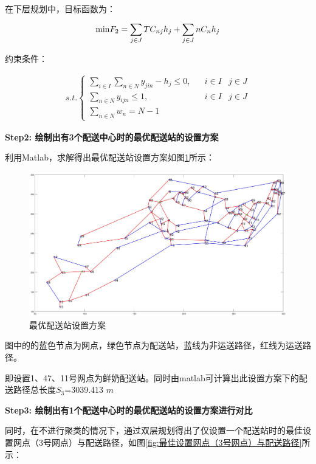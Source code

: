 \documentclass[withoutpreface,bwprint]{cumcmthesis} %
\begin{document}
	在下层规划中，目标函数为：
	\begin{align*}
		{\rm{min }}{F_2} = \sum\limits_{j \in J}^{} {T{C_{nj}}} {h_j} + \sum\limits_{j \in J}^{} {n{C_n}} {h_j}
	\end{align*}
	
	约束条件：
	
	\begin{align*}
		s.t.\left \{{\begin{matrix}\sum_{i\in I}^{}{\sum_{n\in N}^{}{{{y}_{jin}}}}-{{h}_{j}}\le 0,&&i\in I&j\in J\\\sum_{n\in N}^{}{{{y}_{ijn}}}\le 1,&&i\in I&j\in J\\\sum_{n\in N}^{}{{{w}_{n}}}=N-1&&&\end{matrix}}\right.
	\end{align*}
	
	
	\textbf{Step2: 绘制出有3个配送中心时的最优配送站的设置方案}
	
	利用Matlab，求解得出最优配送站设置方案如图\ref{fig:最优配送站设置方案}所示：
	\begin{figure}[htbp]
		\centering
		\includegraphics[width=16cm]{cluster3_real_red_G1.eps}
		\caption{最优配送站设置方案}
		\label{fig:最优配送站设置方案}
	\end{figure}
	
	图中的的蓝色节点为网点，绿色节点为配送站，蓝线为非运送路径，红线为运送路径。
	
	即设置1、47、11号网点为鲜奶配送站。同时由matlab可计算出此设置方案下的配送路径总长度$S_3$=3039.413 $m$
	
\textbf{Step3: 绘制出有1个配送中心时的最优配送站的设置方案进行对比}

同时，在不进行聚类的情况下，通过双层规划得出了仅设置一个配送站时的最佳设置网点（3号网点）与配送路径，如图\ref{fig:最佳设置网点（3号网点）与配送路径}所示：
\end{document}
